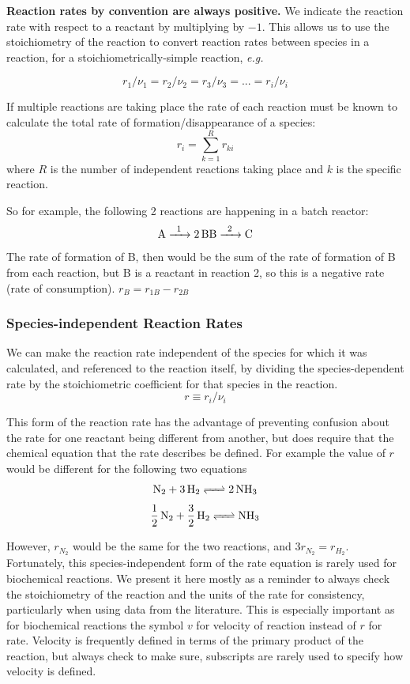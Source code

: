 \documentclass[
]{article}
\begin{document}
\textbf{Reaction rates by convention are always positive.} We indicate the reaction rate with respect to a reactant by multiplying by \(-1\). This allows us to use the stoichiometry of the reaction to convert reaction rates between species in a reaction, for a stoichiometrically-simple reaction, \emph{e.g.}

\[ r_1/\nu_1 = r_2/\nu_2 = r_3/\nu_3 =  ... = r_i/\nu_i\]

If multiple reactions are taking place the rate of each reaction must be known to calculate the total rate of formation/disappearance of a species:
\[r_i = \sum_{k=1}^{R}r_{ki}\]
where \(R\) is the number of independent reactions taking place and \(k\) is the specific reaction.

So for example, the following 2 reactions are happening in a batch reactor:
\[\ce{A ->[1] 2B} \\ 
\ce{B ->[2] C}\]
The rate of formation of B, then would be the sum of the rate of formation of B from each reaction, but B is a reactant in reaction 2, so this is a negative rate (rate of consumption).
\(r_B = r_{1B} - r_{2B}\)

\hypertarget{species-independent-reaction-rates}{%
\subsubsection{Species-independent Reaction Rates}\label{species-independent-reaction-rates}}

We can make the reaction rate independent of the species for which it was calculated, and referenced to the reaction itself, by dividing the species-dependent rate by the stoichiometric coefficient for that species in the reaction.
\[r \equiv r_i/\nu_i\]

This form of the reaction rate has the advantage of preventing confusion about the rate for one reactant being different from another, but does require that the chemical equation that the rate describes be defined. For example the value of \(r\) would be different for the following two equations
\[\ce{N_2 + 3H_2 <=> 2NH_3}\]
\[\ce{1/2N_2 + 3/2H_2 <=> NH_3}\]

However, \(r_{N_2}\) would be the same for the two reactions, and \(3r_{N_2} = r_{H_2}\). Fortunately, this species-independent form of the rate equation is rarely used for biochemical reactions. We present it here mostly as a reminder to always check the stoichiometry of the reaction and the units of the rate for consistency, particularly when using data from the literature. This is especially important as for biochemical reactions the symbol \(v\) for velocity of reaction instead of \(r\) for rate. Velocity is frequently defined in terms of the primary product of the reaction, but always check to make sure, subscripts are rarely used to specify how velocity is defined.
\end{document}
